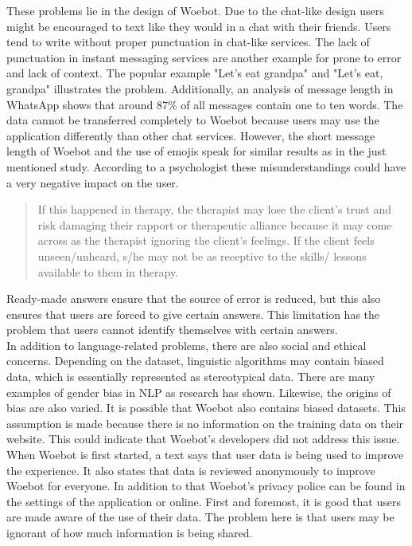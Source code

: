 These problems lie in the design of Woebot.
Due to the chat-like design users might be encouraged to text like they would in a chat with their friends.
Users tend to write without proper punctuation in chat-like services\cite{punctuation}.
The lack of punctuation in instant messaging services are another example for prone to error and lack of context.
The popular example "Let's eat grandpa" and "Let's eat, grandpa" illustrates the problem.
Additionally, an analysis of message length in WhatsApp shows that around 87\% of all messages contain one to ten words\cite{whatsapp-usage}.
The data cannot be transferred completely to Woebot because users may use the application differently than other chat services.
However, the short message length of Woebot and the use of emojis speak for similar results as in the just mentioned study.
According to a psychologist these misunderstandings could have a very negative impact on the user\cite{investigating-students}.

\begin{quote}
    If this happened in therapy, the therapist may lose the client's trust and risk damaging their rapport or therapeutic alliance because it may come across as the therapist ignoring the client's feelings.
    If the client feels unseen/unheard, s/he may not be as receptive to the skills/ lessons available to them in therapy.
\end{quote}

Ready-made answers ensure that the source of error is reduced, but this also ensures that users are forced to give certain answers.
This limitation has the problem that users cannot identify themselves with certain answers\cite{emoticons}.\\

In addition to language-related problems, there are also social and ethical concerns.
Depending on the dataset, linguistic algorithms may contain biased data, which is essentially represented as stereotypical data.
There are many examples of gender bias in NLP as research has shown\cite{gender-bias-nlp}.
Likewise, the origins of bias are also varied\cite{sources-bias-nlp}.
It is possible that Woebot also contains biased datasets.
This assumption is made because there is no information on the training data on their website.
This could indicate that Woebot's developers did not address this issue.\\

When Woebot is first started, a text says that user data is being used to improve the experience.
It also states that data is reviewed anonymously to improve Woebot for everyone.
In addition to that Woebot's privacy police can be found in the settings of the application or online\cite{woebot-privacy}.
First and foremost, it is good that users are made aware of the use of their data.
The problem here is that users may be ignorant of how much information is being shared.\\

